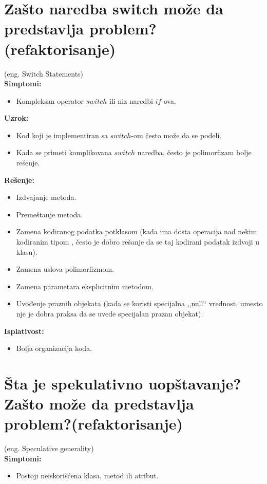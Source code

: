 \documentclass[a4paper]{article}
\begin{document}
\section{Zašto naredba switch može da predstavlja problem? (refaktorisanje)}
  (eng. Switch Statements)\\
  \textbf{Simptomi:}
  \begin{itemize}
    \item Kompleksan operator $switch$ ili niz naredbi $if$-ova.
  \end{itemize}

  \noindent \textbf{Uzrok:} 
  \begin{itemize}
    \item Kod koji je implementiran sa $switch$-om često može da se podeli. 
    \item Kada se primeti komplikovana $switch$ naredba, često je polimorfizam bolje rešenje.
  \end{itemize}

  \noindent \textbf{Rešenje:} 
  \begin{itemize}
    \item Izdvajanje metoda.
    \item Premeštanje metoda.
    \item Zamena kodiranog podatka potklasom (kada ima dosta operacija nad nekim kodiranim tipom
          , često je dobro rešanje da se taj kodirani podatak izdvoji u klasu).
    \item Zamena uslova polimorfizmom.
    \item Zamena parametara eksplicitnim metodom.
    \item Uvođenje praznih objekata (kada se koristi specijalna ,,null`` vrednost, umesto
          nje je dobra praksa da se uvede specijalan prazan objekat).
  \end{itemize}

  \noindent \textbf{Isplativost:} 
  \begin{itemize}
    \item Bolja organizacija koda.
  \end{itemize}

\section{Šta je spekulativno uopštavanje? Zašto može da predstavlja
        problem?(refaktorisanje)}
  (eng. Speculative generality)\\
  \textbf{Simptomi:}
  \begin{itemize}
    \item Postoji neiskorišćena klasa, metod ili atribut.
  \end{itemize}
\end{document}

